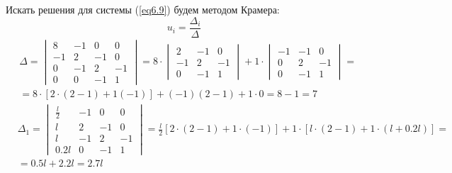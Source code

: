 Искать решения для системы (\ref{eq6.9}) будем методом Крамера:
\begin{equation}
    \label{eq6.10}
    u_i = \frac{\Delta_i}{\Delta}
\end{equation}
\begin{equation}
    \label{eq6.11}
    \begin{split}
        & \Delta =
        \begin{vmatrix}
            8 & -1 & 0 & 0
            \\
            -1 & 2 & -1 & 0
            \\
            0 & -1 & 2 & -1
            \\
            0 & 0 & -1 & 1
        \end{vmatrix}
        = 8 \cdot
        \begin{vmatrix}
            2 & -1 & 0
            \\
            -1 & 2 & -1
            \\
            0 & -1 & 1
        \end{vmatrix}
        + 1 \cdot
        \begin{vmatrix}
            -1 & -1 & 0
            \\
            0 & 2 & -1
            \\
            0 & -1 & 1
        \end{vmatrix}
        =
        \\
        & = 8 \cdot [2 \cdot (2-1) + 1(-1)] + (-1)(2-1) + 1 \cdot 0 = 8 - 1 = 7
    \end{split}
\end{equation}
\begin{equation}
    \label{eq6.12}
    \begin{split}
        & \Delta_1 = 
        \begin{vmatrix}
            \displaystyle \frac{l}{2} & -1 & 0 & 0
            \\
            l & 2 & -1 & 0
            \\
            l & -1 & 2 & -1
            \\
            0.2l & 0 & -1 & 1
        \end{vmatrix}
        = \frac{l}{2} [ 2 \cdot (2 - 1) + 1 \cdot (-1) ] + 1 \cdot [l \cdot (2 - 1) + 1 \cdot (l + 0.2l)] = 
        \\
        & = 0.5l + 2.2l = 2.7l
    \end{split}
\end{equation}
